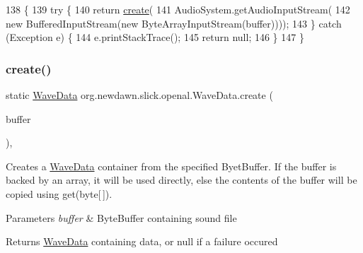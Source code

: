 \begin{DoxyCode}
138                                                  \{
139         \textcolor{keywordflow}{try} \{
140             \textcolor{keywordflow}{return} \mbox{\hyperlink{classorg_1_1newdawn_1_1slick_1_1openal_1_1_wave_data_a8848866627bc92b5a94a59b800e8627c}{create}}(
141                 AudioSystem.getAudioInputStream(
142                     \textcolor{keyword}{new} BufferedInputStream(\textcolor{keyword}{new} ByteArrayInputStream(buffer))));
143         \} \textcolor{keywordflow}{catch} (Exception e) \{
144             e.printStackTrace();
145             \textcolor{keywordflow}{return} null;
146         \}
147     \}
\end{DoxyCode}
\mbox{\label{classorg_1_1newdawn_1_1slick_1_1openal_1_1_wave_data_af22d9228455a9dae61901e46d60fdd61}} 
\subsubsection{\texorpdfstring{create()}{create()}\hspace{0.1cm}{\footnotesize\ttfamily [5/6]}}
{\footnotesize\ttfamily static \mbox{\hyperlink{classorg_1_1newdawn_1_1slick_1_1openal_1_1_wave_data}{Wave\+Data}} org.\+newdawn.\+slick.\+openal.\+Wave\+Data.\+create (\begin{DoxyParamCaption}\item[{Byte\+Buffer}]{buffer }\end{DoxyParamCaption})\hspace{0.3cm}{\ttfamily [inline]}, {\ttfamily [static]}}

Creates a \mbox{\hyperlink{classorg_1_1newdawn_1_1slick_1_1openal_1_1_wave_data}{Wave\+Data}} container from the specified Byet\+Buffer. If the buffer is backed by an array, it will be used directly, else the contents of the buffer will be copied using get(byte\mbox{[}$\,$\mbox{]}).


\begin{DoxyParams}{Parameters}
{\em buffer} & Byte\+Buffer containing sound file \\
\hline
\end{DoxyParams}
\begin{DoxyReturn}{Returns}
\mbox{\hyperlink{classorg_1_1newdawn_1_1slick_1_1openal_1_1_wave_data}{Wave\+Data}} containing data, or null if a failure occured 
\end{DoxyReturn}

